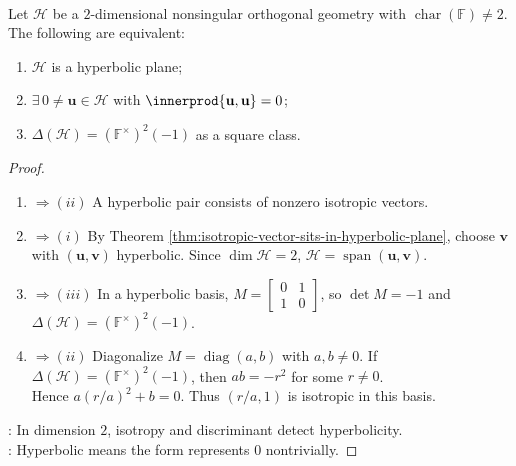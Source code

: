\begin{proposition} \label{prop:hyperbolic-plane-orthogonal-criteria} \\
Let $\mathcal{H}$ be a $2$-dimensional nonsingular orthogonal geometry with $\operatorname{char}(\mathbb{F})\neq2$. The following are equivalent:
\begin{enumerate}[label=(\roman*)]
\setlength{\itemsep}{0pt}
\item $\mathcal{H}$ is a hyperbolic plane;
\item $\exists\,0\neq\mathbf{u}\in\mathcal{H}$ with $\innerprod{\mathbf{u},\mathbf{u}}=0$;
\item $\Delta(\mathcal{H})=(\mathbb{F}^{\times})^2(-1)$ as a square class.
\end{enumerate}
\begin{proof}
\begin{enumerate}[label=(\roman*).]
\setlength{\itemsep}{0pt}
\item[$(i)$]$\Rightarrow (ii)$ A hyperbolic pair consists of nonzero isotropic vectors.
\item[$(ii)$]$\Rightarrow (i)$ By Theorem \ref{thm:isotropic-vector-sits-in-hyperbolic-plane}, choose $\mathbf{v}$ with $(\mathbf{u},\mathbf{v})$ hyperbolic. Since $\dim\mathcal{H}=2$, $\mathcal{H}=\operatorname{span}(\mathbf{u},\mathbf{v})$.
\item[$(i)$]$\Rightarrow (iii)$ In a hyperbolic basis, $M=\begin{bmatrix}0&1\\1&0\end{bmatrix}$, so $\det M=-1$ and $\Delta(\mathcal{H})=(\mathbb{F}^{\times})^2(-1)$.
\item[$(iii)$]$\Rightarrow (ii)$ Diagonalize $M=\operatorname{diag}(a,b)$ with $a,b\neq0$. If $\Delta(\mathcal{H})=(\mathbb{F}^{\times})^2(-1)$, then $ab=-r^2$ for some $r\neq0$.\\
Hence $a(r/a)^2+b=0$. Thus $(r/a,1)$ is isotropic in this basis.
\end{enumerate}
: In dimension $2$, isotropy and discriminant detect hyperbolicity.\\
: Hyperbolic means the form represents $0$ nontrivially.
\end{proof}
\end{proposition}

